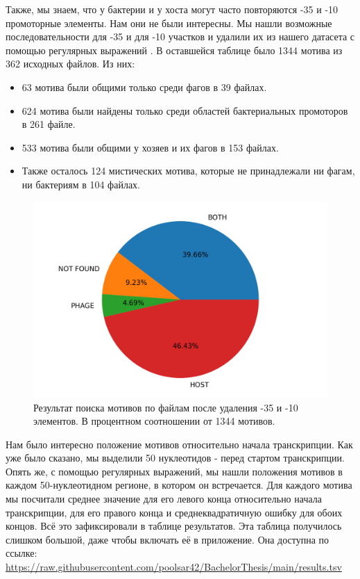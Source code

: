 \documentclass[14pt]{extarticle}
\begin{document}
\par{Также, мы знаем, что у бактерии и у хоста могут часто повторяются -35 и -10 промоторные элементы. Нам они не
    были интересны. Мы нашли возможные последовательности для -35 и для -10 участков \cite{-35,-35-10,-35-10wiki} и 
    удалили их из нашего датасета с помощью регулярных выражений \cite{re}. В оставшейся таблице было 1344 мотива из 362
    исходных файлов. Из 
    них:} 
    
    \begin{itemize}
        \item 63 мотива были общими только среди фагов в 39 файлах.
        \item 624 мотива были найдены только среди областей бактериальных промоторов в 261 файле.
        \item 533 мотива были общими у хозяев и их фагов в 153 файлах.
        \item Также осталось 124 мистических мотива, которые не принадлежали ни фагам, ни бактериям в 104 файлах. 
    \end{itemize}
    
    \begin{figure}[h]
        \centering
        \includegraphics[width=\textwidth]{img/plot_.png}
        \caption{Результат поиска мотивов по файлам после удаления -35 и -10 элементов. В процентном соотношении от 1344 мотивов.}
        \label{fig:skybox}
    \end{figure}
    
    
    \par{Нам было интересно положение мотивов относительно начала транскрипции. Как уже было сказано, мы выделили 50 
    нуклеотидов - перед стартом транскрипции. Опять же, с помощью регулярных выражений, мы нашли положения мотивов в
    каждом 50-нуклеотидном регионе, в котором он встречается. Для каждого мотива мы посчитали среднее значение для его
    левого конца относительно начала транскрипции, для его правого конца и среднеквадратичную ошибку для обоих
    концов. Всё это зафиксировали в таблице результатов. Эта таблица получилось слишком большой, даже чтобы включать её в приложение. Она доступна по ссылке:
    \url{https://raw.githubusercontent.com/poolsar42/BachelorThesis/main/results.tsv}}
\end{document}
